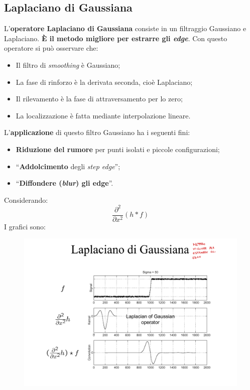 \documentclass[a4paper]{article}
\newcommand{\dquotes}[1]{``#1''}
\begin{document}
	\subsection{Laplaciano di Gaussiana}
	
	L'\textcolor{Red3}{\textbf{operatore Laplaciano  di Gaussiana}} consiste in un filtraggio Gaussiano e Laplaciano. \textbf{È il metodo migliore per estrarre gli \emph{edge}}. Con questo operatore si può osservare che:
	\begin{itemize}[label=-]
		\item Il filtro di \emph{smoothing} è Gaussiano;
		\item La fase di rinforzo è la derivata seconda, cioè Laplaciano;
		\item Il rilevamento è la fase di attraversamento per lo zero;
		\item La localizzazione è fatta mediante interpolazione lineare.
	\end{itemize}
	L'\textbf{applicazione} di questo filtro Gaussiano ha i seguenti fini:
	\begin{itemize}
		\item \textbf{Riduzione del rumore} per punti isolati e piccole configurazioni;
		\item \dquotes{\textbf{Addolcimento} degli \emph{step edge}};
		\item \dquotes{\textbf{Diffondere (\emph{blur}) gli edge}}.
	\end{itemize}
	Considerando:
	\begin{equation*}
		\dfrac{\partial^{2}}{\partial x^{2}}\left(h*f\right)
	\end{equation*}
	I grafici sono:
	\begin{figure}[!htp]
		\centering
		\includegraphics[width=\textwidth]{img/laplaciano_gaussiana.pdf}
	\end{figure}\newpage
	
\end{document}
